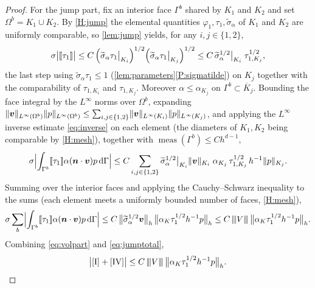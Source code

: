 \documentclass[11pt,a4paper]{article}
\newcommand{\bv}{\boldsymbol{v}}
\newcommand{\bn}{\boldsymbol{n}}
\newcommand{\dd}{\,\mathrm{d}}
\newcommand{\jump}[1]{[\![#1]\!]}
\DeclarePairedDelimiter{\norm}{\lVert}{\rVert}
\newcommand{\triplenorm}[1]{{\lvert\kern-0.25ex\lvert\kern-0.25ex\lvert #1
\rvert\kern-0.25ex\rvert\kern-0.25ex\rvert}}
\newcommand{\sigmatilde}{\widetilde{\sigma}_{\alpha}}
\theoremstyle{plain}
\theoremstyle{remark}
\theoremstyle{definition}
\numberwithin{equation}{section}
\begin{document}
\begin{proof}
For the jump part, fix an interior face $\Gamma^b$ shared by $K_1$ and $K_2$ and set
$\Omega^b=K_1\cup K_2$. By \cref{H:jump} the elemental quantities
$\varphi_1,\tau_1,\sigmatilde$ of $K_1$ and $K_2$ are uniformly comparable, so
\cref{lem:jump} yields, for any $i,j\in\{1,2\}$,
\begin{equation}\label{eq:jumpsplit}
  \sigma\bigl|\jump{\tau_1}\bigr|
  \le C\,\Bigl(\sigmatilde\tau_1\big|_{K_i}\Bigr)^{1/2}
        \Bigl(\sigmatilde\tau_1\big|_{K_j}\Bigr)^{1/2}
  \le C\,\sigmatilde^{1/2}\big|_{K_i}\;\tau_{1,K_j}^{1/2},
\end{equation}
the last step using $\sigmatilde\tau_1\le1$ (\cref{lem:parameters}\ref{P:sigmatilde})
on $K_j$ together with the comparability of $\tau_{1,K_i}$ and $\tau_{1,K_j}$.
Moreover $\alpha\le\alpha_{K_j}$ on $\Gamma^b\subset\overline{K}_j$. Bounding the face
integral by the $L^\infty$ norms over $\Omega^b$, expanding
$\norm{\bv}_{L^\infty(\Omega^b)}\norm{p}_{L^\infty(\Omega^b)}
\le\sum_{i,j\in\{1,2\}}\norm{\bv}_{L^\infty(K_i)}\norm{p}_{L^\infty(K_j)}$, and applying
the $L^\infty$ inverse estimate \eqref{eq:inverse} on each element (the diameters of
$K_1,K_2$ being comparable by \cref{H:mesh}), together with
$\operatorname{meas}(\Gamma^b)\le C h^{d-1}$,
\begin{equation}\label{eq:jumppart}
  \sigma\Bigl|\int_{\Gamma^b}\jump{\tau_1}\alpha(\bn\cdot\bv)p\dd\Gamma\Bigr|
  \le C\sum_{i,j\in\{1,2\}}
  \sigmatilde^{1/2}\big|_{K_i}\norm{\bv}_{K_i}\;
  \alpha_{K_j}\,\tau_{1,K_j}^{1/2}\,h^{-1}\norm{p}_{K_j}.
\end{equation}
Summing over the interior faces and applying the Cauchy--Schwarz inequality to the sums
(each element meets a uniformly bounded number of faces, \cref{H:mesh}),
\begin{equation}\label{eq:jumptotal}
  \sigma\sum_{b}\Bigl|\int_{\Gamma^b}\jump{\tau_1}\alpha(\bn\cdot\bv)p
  \dd\Gamma\Bigr|
  \le C\,\bigl\lVert\sigmatilde^{1/2}\bv\bigr\rVert_h\,
  \bigl\lVert\alpha_K\tau_1^{1/2}h^{-1}p\bigr\rVert_h
  \le C\,\triplenorm{V}\,
  \bigl\lVert\alpha_K\tau_1^{1/2}h^{-1}p\bigr\rVert_h .
\end{equation}
Combining \eqref{eq:volpart} and \eqref{eq:jumptotal},
\begin{equation}\label{eq:IIVbound}
  \bigl|\textup{[I]}+\textup{[IV]}\bigr|
  \le C\,\triplenorm{V}\,
  \bigl\lVert\alpha_K\tau_1^{1/2}h^{-1}p\bigr\rVert_h .
\end{equation}


\end{proof}
\end{document}
